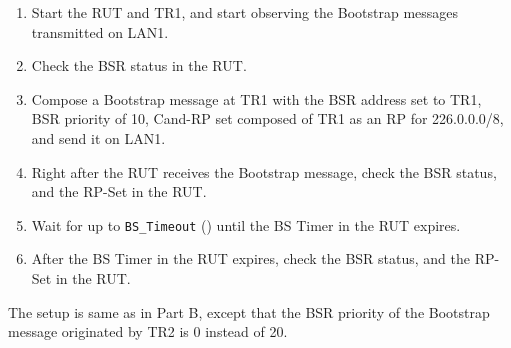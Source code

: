 \documentclass[11pt]{report}
\begin{document}
\begin{enumerate}

  \item Start the RUT and TR1, and start observing the Bootstrap messages
  transmitted on LAN1.

  \item Check the BSR status in the RUT.

  \item Compose a Bootstrap message at TR1 with the BSR address set to TR1,
  BSR priority of 10, Cand-RP set composed of TR1 as an RP for 226.0.0.0/8,
  and send it on LAN1.

  \item Right after the RUT receives the Bootstrap message, check the BSR
  status, and the RP-Set in the RUT.

  \item Wait for up to \verb=BS_Timeout= ({\PimsmBSTimeout}) until the BS
  Timer in the RUT expires.

  \item After the BS Timer in the RUT expires, check the BSR status, and the
  RP-Set in the RUT.

\end{enumerate}


The setup is same as in Part B, except that the BSR priority of the Bootstrap
message originated by TR2 is 0 instead of 20.

\end{document}
